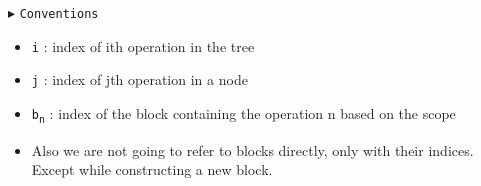 \documentclass[10pt]{article}
\newcommand{\sub}[1]{\textsubscript{#1}}
\renewcommand{\tt}[1]{\texttt{#1}}
\theoremstyle{definition}
\begin{document}
\begin{algorithm}
\begin{algorithmic}[1]
\begin{multicols}{2}
\Statex $\blacktriangleright$ \tt{Conventions}
\begin{itemize}
  \item \tt{i} : index of ith operation in the tree
  \item \tt{j} : index of jth operation in a node
  \item \tt{b\sub{n}} : index of the block containing the operation n based on the scope
  \item Also we are not going to refer to blocks directly, only with their indices. Except while constructing a new block.
\end{itemize}
\end{multicols}
\end{algorithmic}
\end{algorithm}


\end{document}
